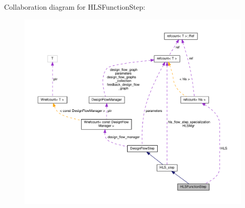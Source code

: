 Collaboration diagram for H\+L\+S\+Function\+Step\+:
\nopagebreak
\begin{figure}[H]
\begin{center}
\leavevmode
\includegraphics[width=350pt]{d3/ded/classHLSFunctionStep__coll__graph}
\end{center}
\end{figure}

